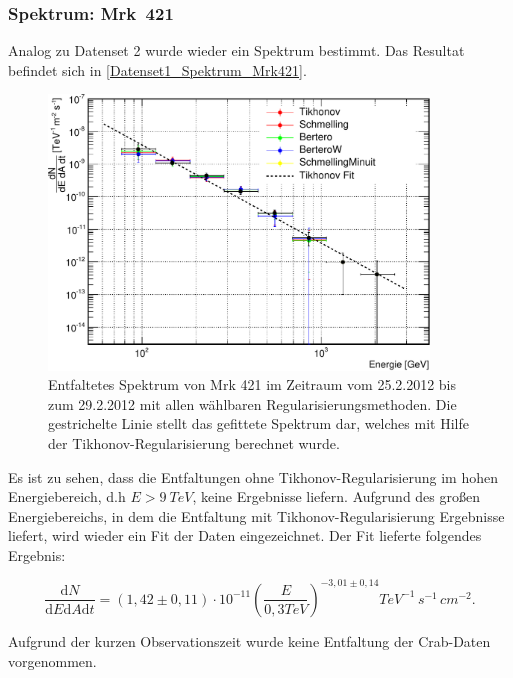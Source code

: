 \FloatBarrier

\subsubsection{Spektrum: Mrk~421}
Analog zu Datenset 2 wurde wieder ein Spektrum bestimmt.
Das Resultat befindet sich in \autoref{Datenset1_Spektrum_Mrk421}.

\begin{figure}
    \centering
    \includegraphics[width=0.9\textwidth]{./Plots/04_MrkAnalyse/Datenset1/Spektrum_Mrk421.pdf}
    \caption{Entfaltetes Spektrum von Mrk 421 im Zeitraum vom 25.2.2012 bis zum 29.2.2012 mit allen wählbaren Regularisierungsmethoden.
    Die gestrichelte Linie stellt das gefittete Spektrum dar, welches mit Hilfe der Tikhonov-Regularisierung berechnet wurde.}
    \label{Datenset1_Spektrum_Mrk421}
\end{figure}

Es ist zu sehen, dass die Entfaltungen ohne Tikhonov-Regularisierung im hohen Energiebereich, d.h $E>\SI{9}{TeV}$, keine Ergebnisse liefern.
Aufgrund des großen Energiebereichs, in dem die Entfaltung mit Tikhonov-Regularisierung Ergebnisse liefert, wird wieder ein Fit der Daten eingezeichnet.
Der Fit lieferte folgendes Ergebnis:

\begin{equation}
 \frac{\mathrm{d}N}{\mathrm{d}E\mathrm{d}A\mathrm{d}t}=(1,42 \pm 0,11) \cdot 10^{-11}\left( \frac{E}{0,3 \si{TeV}} \right)^{-3,01\pm 0,14} \si{TeV^{-1}\,s^{-1}\,cm^{-2}}.
\end{equation}

Aufgrund der kurzen Observationszeit wurde keine Entfaltung der Crab-Daten vorgenommen.

